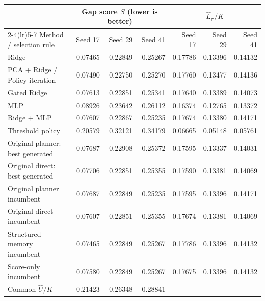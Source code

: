 \begin{tabular}{l rrr rrr}
\toprule
 & \multicolumn{3}{c}{Gap score $S$ (lower is better)} & \multicolumn{3}{c}{$\hat L_\pi/K$} \\
\cmidrule(lr){2-4}\cmidrule(lr){5-7}
Method / selection rule & Seed 17 & Seed 29 & Seed 41 & Seed 17 & Seed 29 & Seed 41 \\
\midrule
Ridge & 0.07465 & 0.22849 & 0.25267 & 0.17786 & 0.13396 & 0.14132 \\
PCA + Ridge / Policy iteration$^\dagger$ & 0.07490 & 0.22750 & 0.25270 & 0.17760 & 0.13477 & 0.14136 \\
Gated Ridge & 0.07613 & 0.22851 & 0.25341 & 0.17640 & 0.13389 & 0.14073 \\
MLP & 0.08926 & 0.23642 & 0.26112 & 0.16374 & 0.12765 & 0.13372 \\
Ridge + MLP & 0.07607 & 0.22867 & 0.25235 & 0.17674 & 0.13380 & 0.14171 \\
Threshold policy & 0.20579 & 0.32121 & 0.34179 & 0.06665 & 0.05148 & 0.05761 \\
Original planner: best generated & 0.07687 & 0.22908 & 0.25372 & 0.17595 & 0.13337 & 0.14031 \\
Original direct: best generated & 0.07706 & 0.22851 & 0.25355 & 0.17590 & 0.13381 & 0.14069 \\
Original planner incumbent & 0.07687 & 0.22849 & 0.25235 & 0.17595 & 0.13396 & 0.14171 \\
Original direct incumbent & 0.07607 & 0.22851 & 0.25355 & 0.17674 & 0.13381 & 0.14069 \\
Structured-memory incumbent & 0.07465 & 0.22849 & 0.25267 & 0.17786 & 0.13396 & 0.14132 \\
Score-only incumbent & 0.07580 & 0.22849 & 0.25267 & 0.17675 & 0.13396 & 0.14132 \\
\midrule
Common $\hat U/K$ & 0.21423 & 0.26348 & 0.28841 & & & \\
\bottomrule
\end{tabular}
